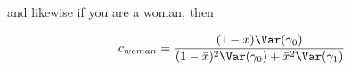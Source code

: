 and likewise if you are a woman, then

\begin{align*}
	c_{woman} = \frac{(1-\bar{x})\Var(\gamma_0)}{(1-\bar{x})^2\Var(\gamma_0) + \bar{x}^2\Var(\gamma_1)}
\end{align*}







